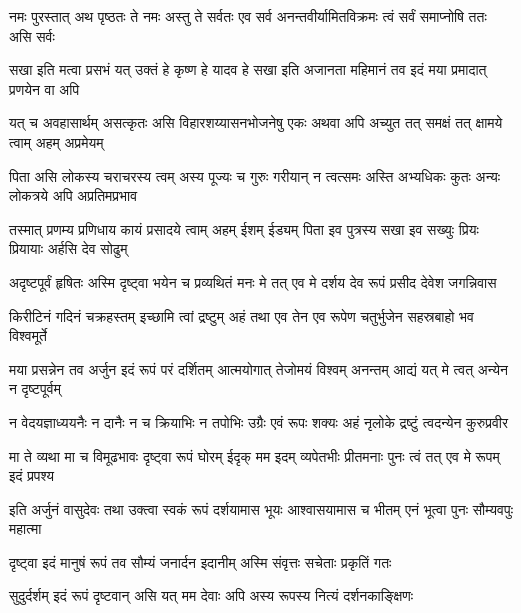 \fourlineindentedshloka
{नमः पुरस्तात् अथ पृष्ठतः ते}
{नमः अस्तु ते सर्वतः एव सर्व}
{अनन्तवीर्यामितविक्रमः त्वं}
{सर्वं समाप्नोषि ततः असि सर्वः}%

\fourlineindentedshloka
{सखा इति मत्वा प्रसभं यत् उक्तं}
{हे कृष्ण हे यादव हे सखा इति}
{अजानता महिमानं तव इदं}
{मया प्रमादात् प्रणयेन वा अपि}%

\fourlineindentedshloka
{यत् च अवहासार्थम् असत्कृतः असि}
{विहारशय्यासनभोजनेषु}
{एकः अथवा अपि अच्युत तत् समक्षं}
{तत् क्षामये त्वाम् अहम् अप्रमेयम्}%

\fourlineindentedshloka
{पिता असि लोकस्य चराचरस्य}
{त्वम् अस्य पूज्यः च गुरुः गरीयान्}
{न त्वत्समः अस्ति अभ्यधिकः कुतः अन्यः}
{लोकत्रये अपि अप्रतिमप्रभाव}%

\fourlineindentedshloka
{तस्मात् प्रणम्य प्रणिधाय कायं}
{प्रसादये त्वाम् अहम् ईशम् ईड्यम्}
{पिता इव पुत्रस्य सखा इव सख्युः}
{प्रियः प्रियायाः अर्हसि देव सोढुम्}%

\fourlineindentedshloka
{अदृष्टपूर्वं हृषितः अस्मि दृष्ट्वा}
{भयेन च प्रव्यथितं मनः मे}
{तत् एव मे दर्शय देव रूपं}
{प्रसीद देवेश जगन्निवास}%

\fourlineindentedshloka
{किरीटिनं गदिनं चक्रहस्तम्}
{इच्छामि त्वां द्रष्टुम् अहं तथा एव}
{तेन एव रूपेण चतुर्भुजेन}
{सहस्रबाहो भव विश्वमूर्ते}%


\fourlineindentedshloka
{मया प्रसन्नेन तव अर्जुन इदं}
{रूपं परं दर्शितम् आत्मयोगात्}
{तेजोमयं विश्वम् अनन्तम् आद्यं}
{यत् मे त्वत् अन्येन न दृष्टपूर्वम्}%

\fourlineindentedshloka
{न वेदयज्ञाध्ययनैः न दानैः}
{न च क्रियाभिः न तपोभिः उग्रैः}
{एवं रूपः शक्यः अहं नृलोके}
{द्रष्टुं त्वदन्येन कुरुप्रवीर}%

\fourlineindentedshloka
{मा ते व्यथा मा च विमूढभावः}
{दृष्ट्वा रूपं घोरम् ईदृक् मम इदम्}
{व्यपेतभीः प्रीतमनाः पुनः त्वं}
{तत् एव मे रूपम् इदं प्रपश्य}%


\fourlineindentedshloka
{इति अर्जुनं वासुदेवः तथा उक्त्वा}
{स्वकं रूपं दर्शयामास भूयः}
{आश्वासयामास च भीतम् एनं}
{भूत्वा पुनः सौम्यवपुः महात्मा}%


\twolineshloka
{दृष्ट्वा इदं मानुषं रूपं तव सौम्यं जनार्दन}
{इदानीम् अस्मि संवृत्तः सचेताः प्रकृतिं गतः}%


\twolineshloka
{सुदुर्दर्शम् इदं रूपं दृष्टवान् असि यत् मम}
{देवाः अपि अस्य रूपस्य नित्यं दर्शनकाङ्क्षिणः}%

